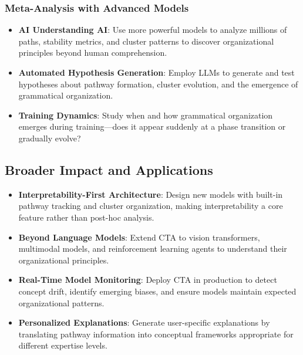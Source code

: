 \subsubsection{Meta-Analysis with Advanced Models}

\begin{itemize}
    \item \textbf{AI Understanding AI}: Use more powerful models to analyze millions of paths, stability metrics, and cluster patterns to discover organizational principles beyond human comprehension.
    
    \item \textbf{Automated Hypothesis Generation}: Employ LLMs to generate and test hypotheses about pathway formation, cluster evolution, and the emergence of grammatical organization.
    
    \item \textbf{Training Dynamics}: Study when and how grammatical organization emerges during training—does it appear suddenly at a phase transition or gradually evolve?
\end{itemize}

\subsection{Broader Impact and Applications}

\begin{itemize}
    \item \textbf{Interpretability-First Architecture}: Design new models with built-in pathway tracking and cluster organization, making interpretability a core feature rather than post-hoc analysis.
    
    \item \textbf{Beyond Language Models}: Extend CTA to vision transformers, multimodal models, and reinforcement learning agents to understand their organizational principles.
    
    \item \textbf{Real-Time Model Monitoring}: Deploy CTA in production to detect concept drift, identify emerging biases, and ensure models maintain expected organizational patterns.
    
    \item \textbf{Personalized Explanations}: Generate user-specific explanations by translating pathway information into conceptual frameworks appropriate for different expertise levels.
\end{itemize}

